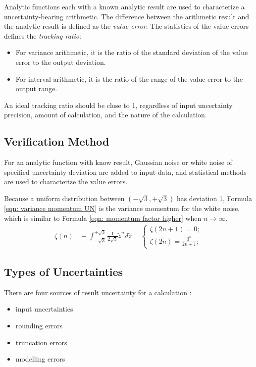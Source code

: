 \documentclass[twoside]{article}
\numberwithin{equation}{section}
\begin{document}
Analytic functions each with a known analytic result are used to characterize a uncertainty-bearing arithmetic. 
The difference between the arithmetic result and the analytic result is defined as the \emph{value error}.
The statistics of the value errors defines the \emph{tracking ratio}:
\begin{itemize}
\item For variance arithmetic, it is the ratio of the standard deviation of the value error to the output deviation.

\item For interval arithmetic, it is the ratio of the range of the value error to the output range.
\end{itemize}
An ideal tracking ratio should be close to 1, regardless of input uncertainty precision, amount of calculation, and the nature of the calculation.


\subsection{Verification Method}

For an analytic function with know result, Gaussian noise or white noise \cite{Statistical_Methods} of specified uncertainty deviation are added to input data, and statistical methods are used to characterize the value errors.

Because a uniform distribution between $(-\sqrt{3}, +\sqrt{3})$ has deviation 1, Formula \eqref{eqn: variance momentum UN} is the variance momentum for the white noise, which is similar to Formula \eqref{eqn: momentum factor higher} when $n \rightarrow \infty$.
\begin{align}
\label{eqn: variance momentum UN}
\zeta(n) &\equiv \int_{-\sqrt{3}}^{+\sqrt{3}} \frac{1}{2 \sqrt{3}} \tilde{z}^n d \tilde{z} = 
\begin{cases} \zeta(2n+1) = 0; \\ \zeta(2n) = \frac{3^{n}}{2n + 1}; \end{cases}
\end{align}


\subsection{Types of Uncertainties}

There are four sources of result uncertainty for a calculation \cite{Statistical_Methods}\cite{Numerical_Recipes}:
\begin{itemize}
\item input uncertainties
\item rounding errors
\item truncation errors
\item modelling errors
\end{itemize}
\end{document}
